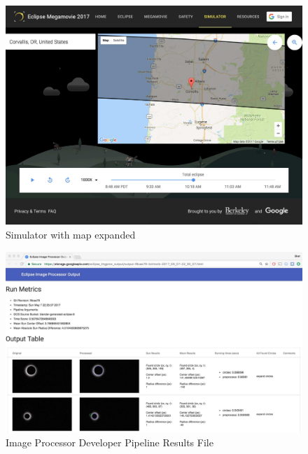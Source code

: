 \documentclass[10pt, onecolumn, draftclsnofoot, letterpaper, compsoc]{IEEEtran}
\begin{document}
\begin{figure}[!h]
	\begin{center}
			\includegraphics[width=\textwidth]{sim_map.pdf}
		\caption{Simulator with map expanded}
	\end{center}
\end{figure}
\newpage

\begin{figure}[!h]
    \begin{center}
            \includegraphics[width=\textwidth]{imgproc.pdf}
        \caption{Image Processor Developer Pipeline Results File}
    \end{center}
\end{figure}
\newpage
\end{document}
